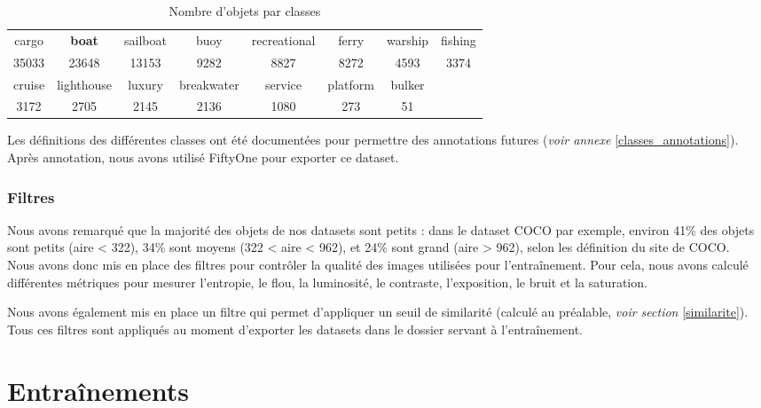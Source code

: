 \begin{table}[!h]
    \caption{Nombre d'objets par classes}
    \begin{center}
    \begin{tabular}{c c c c c c c c}
    \hline
    cargo & \textbf{boat} & sailboat & buoy & recreational & ferry & warship & fishing \\
    35033 & 23648 & 13153 & 9282 & 8827 & 8272 & 4593 & 3374 \\

    \hline
    cruise & lighthouse & luxury & breakwater & service & platform & bulker \\
    3172 & 2705 & 2145 & 2136 & 1080 & 273 & 51
    \end{tabular}
    \end{center}
\end{table}

Les définitions des différentes classes ont été documentées pour permettre
des annotations futures (\textit{voir annexe }\ref{classes_annotations}).
Après annotation, nous avons utilisé FiftyOne pour exporter ce dataset.

\subsubsection{Filtres}

Nous avons remarqué que la majorité des objets de nos datasets sont petits :
dans le dataset COCO par exemple, environ 41\% des objets sont petits (aire < 322),
34\% sont moyens (322 < aire < 962), et 24\% sont grand (aire > 962), selon
les définition du site de COCO.\\

Nous avons donc mis en place des filtres pour contrôler la qualité des images
utilisées pour l'entraînement. Pour cela, nous avons calculé différentes métriques
pour mesurer l'entropie, le flou, la luminosité, le contraste, l'exposition, le bruit et
la saturation.

Nous avons également mis en place un filtre qui permet d'appliquer un seuil
de similarité (calculé au préalable, \textit{voir section }\ref{similarite}).\\

Tous ces filtres sont appliqués au moment d'exporter les datasets dans le dossier
servant à l'entraînement.

\section{Entraînements}

